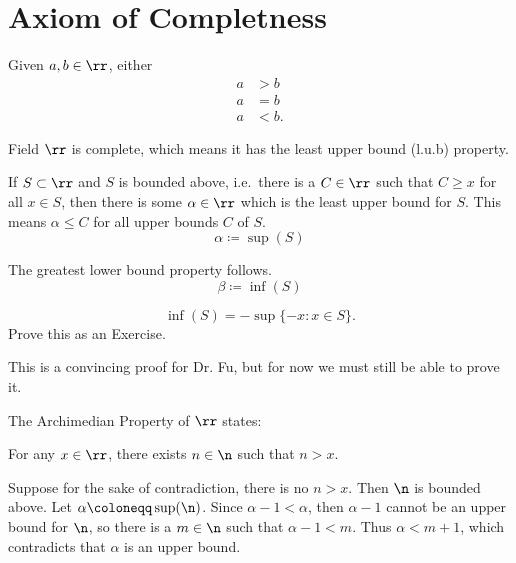 
\section{Axiom of Completness}


\begin{definition}
	Given $a,b\in\rr$, either
	\begin{align*}
		a &> b\\
		a &= b\\
		a &< b.
	\end{align*}
\end{definition}

\begin{remark}
	Field $\rr$ is complete, which means it has the least upper bound (l.u.b) property.
\end{remark}

\begin{definition}[l.u.b Property]
	If $S\subset\rr$ and $S$ is bounded above, i.e.\ there is a $C\in\rr$ such that $C\geq x$ for all $x\in S$, then there is some $\alpha\in\rr$ which is the least upper bound for $S$.
	This means $\alpha\leq C$ for all upper bounds $C$ of $S$.
	\[
	\alpha \coloneqq \sup(S)
	\]
\end{definition}

\begin{corollary}
{The greatest lower bound property follows.}
	\[\beta \coloneqq \inf(S)\]
\end{corollary}

\begin{corollary}
{\[\inf(S) = -\sup\{-x : x\in S\}.\]}
	Prove this as an Exercise.
\end{corollary}

\begin{remark}
	This is a convincing proof for Dr. Fu, but for now we must still be able to prove it.
\end{remark}

\begin{corollary}
{The Archimedian Property of $\rr$ states:
    \begin{displayquote}
        For any $x\in\rr$, there exists $n\in\n$ such that $n > x$.
    \end{displayquote}}
	Suppose for the sake of contradiction, there is no $n > x$.
	Then $\n$ is bounded above.
	Let $\alpha \coloneqq\sup(\n)$.
	Since $\alpha - 1 < \alpha$, then $\alpha - 1$ cannot be an upper bound for $\n$, so there is a $m\in\n$ such that $\alpha - 1 < m$.
	Thus $\alpha < m + 1$, which contradicts that $\alpha$ is an upper bound.
\end{corollary}

